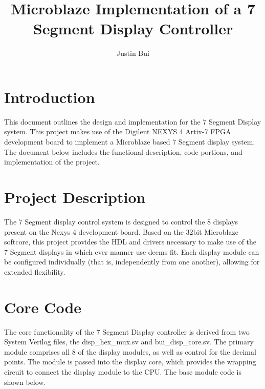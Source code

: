 \documentclass{article}
\author{Justin Bui}
\title{Microblaze Implementation of a 7 Segment Display Controller}
\begin{document}
\maketitle
\newpage

\tableofcontents
\newpage

\section{Introduction}
This document outlines the design and implementation for the 7 Segment Display system. This project makes use of the Digilent NEXYS 4 Artix-7 FPGA development board to implement a Microblaze based 7 Segment display system. The document below includes the functional description, code portions, and implementation of the project. 


\section{Project Description}
The 7 Segment display control system is designed to control the 8 displays present on the Nexys 4 development board. Based on the 32bit Microblaze softcore, this project provides the HDL and drivers necessary to make use of the 7 Segment displays in which ever manner use deems fit. Each display module can be configured individually (that is, independently from one another), allowing for extended flexibility. 

\section{Core Code}
The core functionality of the 7 Segment Display controller is derived from two System Verilog files, the disp\_hex\_mux.sv and bui\_disp\_core.sv. The primary module comprises all 8 of the display modules, as well as control for the decimal points. The module is passed into the display core, which provides the wrapping circuit to connect the display module to the CPU. The base module code is shown below.
\end{document}

